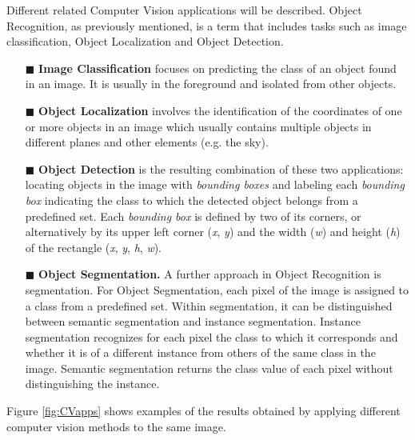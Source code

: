 Different related Computer Vision applications will be described. Object Recognition, as previously mentioned, is a term that includes tasks such as image classification, Object Localization and Object Detection.
\begin{itemize}[]
    \item[\tiny$\blacksquare$]\textbf{Image Classification} focuses on predicting the class of an object found in an image. It is usually in the foreground and isolated from other objects.
    \item[\tiny$\blacksquare$] \textbf{Object Localization} involves the identification of the coordinates of one or more objects in an image which usually contains multiple objects in different planes and other elements (e.g. the sky).
     \item[\tiny$\blacksquare$] \textbf{Object Detection} is the resulting combination of these two applications: locating objects in the image with \emph{bounding boxes} and labeling each \emph{bounding box} indicating the class to which the detected object belongs from a predefined set. Each \emph{bounding box} is defined by two of its corners, or alternatively by its upper left corner (\emph{x}, \emph{y}) and the width (\emph{w}) and height (\emph{h}) of the rectangle (\emph{x}, \emph{y}, \emph{h}, \emph{w}). 
   \item[\tiny$\blacksquare$] \textbf{Object Segmentation.} A further approach in Object Recognition is segmentation. For Object Segmentation, each pixel of the image is assigned to a class from a predefined set. Within segmentation, it can be distinguished between semantic segmentation and instance segmentation. Instance segmentation recognizes for each pixel the class to which it corresponds and whether it is of a different instance from others of the same class in the image. Semantic segmentation returns the class value of each pixel without distinguishing the instance. 
\end{itemize}

Figure \ref{fig:CVapps} shows examples of the results obtained by applying different computer vision methods to the same image.


